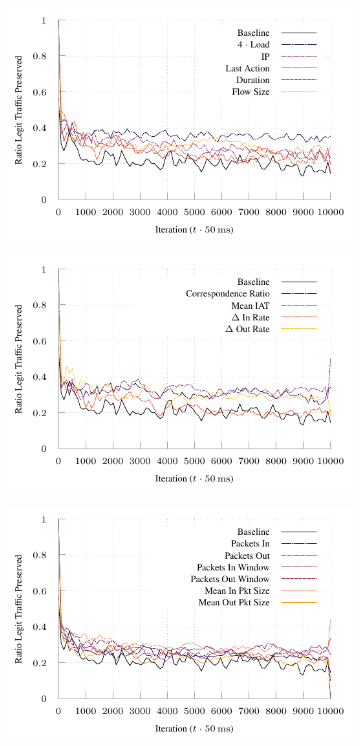 \documentclass[conference, letterpaper, 10pt, times]{IEEEtran}
\begin{document}
\begin{figure}
	\begin{subfigure}{0.32\linewidth}
		\includegraphics[width=\linewidth]{../plots/ftprep-tcp-good}
	\end{subfigure}
	\begin{subfigure}{0.32\linewidth}
		\includegraphics[width=\linewidth]{../plots/ftprep-tcp-good-2}
	\end{subfigure}
	\begin{subfigure}{0.32\linewidth}
		\includegraphics[width=\linewidth]{../plots/ftprep-tcp-good-3}
	\end{subfigure}
	

\end{figure}
\end{document}
